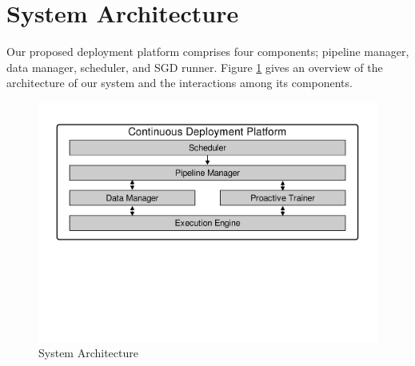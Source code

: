 \section{System Architecture} \label{sec:system-architecutre}
Our proposed deployment platform comprises four components; pipeline manager, data manager, scheduler, and SGD runner.
Figure \ref{fig:system-architecture} gives an overview of the architecture of our system and the interactions among its components.



\begin{figure}[t]
\centering
\includegraphics[width=\columnwidth]{../images/system-architecture.pdf}
\caption{System Architecture}
\label{fig:system-architecture}
\end{figure}

